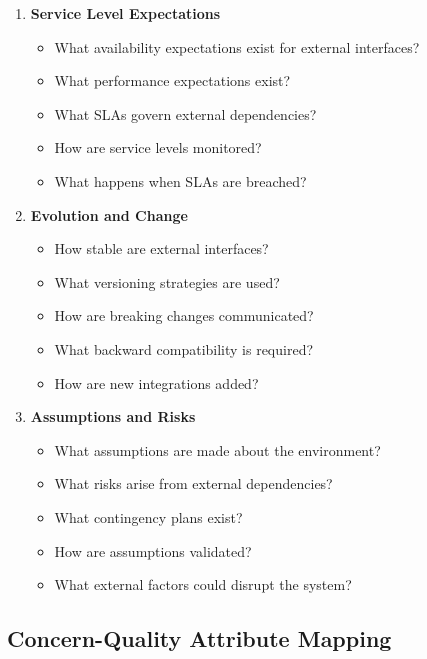 \documentclass[11pt,letterpaper]{article}
\begin{document}
\begin{enumerate}[label=\textbf{C\arabic*:}, leftmargin=2.5em]
    \item \textbf{Service Level Expectations}
    \begin{itemize}[nosep]
        \item What availability expectations exist for external interfaces?
        \item What performance expectations exist?
        \item What SLAs govern external dependencies?
        \item How are service levels monitored?
        \item What happens when SLAs are breached?
    \end{itemize}
    
    \item \textbf{Evolution and Change}
    \begin{itemize}[nosep]
        \item How stable are external interfaces?
        \item What versioning strategies are used?
        \item How are breaking changes communicated?
        \item What backward compatibility is required?
        \item How are new integrations added?
    \end{itemize}
    
    \item \textbf{Assumptions and Risks}
    \begin{itemize}[nosep]
        \item What assumptions are made about the environment?
        \item What risks arise from external dependencies?
        \item What contingency plans exist?
        \item How are assumptions validated?
        \item What external factors could disrupt the system?
    \end{itemize}
\end{enumerate}

\subsection{Concern-Quality Attribute Mapping}
\end{document}
